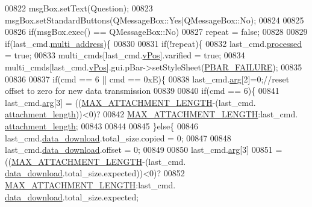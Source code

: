 \begin{DoxyCode}
{{{{{{{{{{{{{{{{{{{{00822     msgBox.setText(Question);
00823     msgBox.setStandardButtons(QMessageBox::Yes|QMessageBox::No);
00824 
00825 
00826     \textcolor{keywordflow}{if}(msgBox.exec() == QMessageBox::No)
00827              repeat = \textcolor{keyword}{false};
00828 
00829         \textcolor{keywordflow}{if}(last\_cmd.\hyperlink{a00001_a8e69b971c61ced27a7567efd2bf0db59}{multi\_address})\{
00830 
00831             \textcolor{keywordflow}{if}(!repeat)\{
00832             last\_cmd.\hyperlink{a00001_a3e88f779da9798a5da7dda227e2ca388}{processed} = \textcolor{keyword}{true};
00833             multi\_cmds[last\_cmd.\hyperlink{a00001_a2b48b371fd84be2a8ad581b1ad708b88}{vPos}].varified = \textcolor{keyword}{true};
00834             multi\_cmds[last\_cmd.\hyperlink{a00001_a2b48b371fd84be2a8ad581b1ad708b88}{vPos}].gui.pBar->setStyleSheet(\hyperlink{a00034_aa9f43b2774395af6510910f8feed7cb4}{PBAR\_FAILURE});
00835             
00836             
00837             \textcolor{keywordflow}{if}(cmd == 6 || cmd == 0xE)\{
00838             last\_cmd.\hyperlink{a00001_a56e6c2d7315d0ae60a51e8b140c9cfe4}{arg}[2]=0;\textcolor{comment}{//reset offset to zero for new data transmission}
00839               
00840             \textcolor{keywordflow}{if}(cmd == 6)\{
00841             last\_cmd.\hyperlink{a00001_a56e6c2d7315d0ae60a51e8b140c9cfe4}{arg}[3] = ((\hyperlink{a00031_aa8abe3a822c64813f7aaba3ca7e3db9c}{MAX\_ATTACHMENT\_LENGTH}-(last\_cmd.
      \hyperlink{a00001_ae5afad7c81dab7d9ab6587251aafdbf4}{attachment\_length}))<0)?
00842                               \hyperlink{a00031_aa8abe3a822c64813f7aaba3ca7e3db9c}{MAX\_ATTACHMENT\_LENGTH}:last\_cmd.
      \hyperlink{a00001_ae5afad7c81dab7d9ab6587251aafdbf4}{attachment\_length};
00843 
00844                 
00845             \}\textcolor{keywordflow}{else}\{
00846             last\_cmd.\hyperlink{a00001_a5cfeaed4d4f8e51070a324c0ba893ebe}{data\_download}.total\_size.copied     = 0;
00847             
00848             last\_cmd.\hyperlink{a00001_a5cfeaed4d4f8e51070a324c0ba893ebe}{data\_download}.offset   = 0;
00849             
00850             last\_cmd.\hyperlink{a00001_a56e6c2d7315d0ae60a51e8b140c9cfe4}{arg}[3]              
00851                     = ((\hyperlink{a00031_aa8abe3a822c64813f7aaba3ca7e3db9c}{MAX\_ATTACHMENT\_LENGTH}-(last\_cmd.
      \hyperlink{a00001_a5cfeaed4d4f8e51070a324c0ba893ebe}{data\_download}.total\_size.expected))<0)?
00852                         \hyperlink{a00031_aa8abe3a822c64813f7aaba3ca7e3db9c}{MAX\_ATTACHMENT\_LENGTH}:last\_cmd.
      \hyperlink{a00001_a5cfeaed4d4f8e51070a324c0ba893ebe}{data\_download}.total\_size.expected;
}}}}}}}}}}}}}}}}}}}}
\end{DoxyCode}
